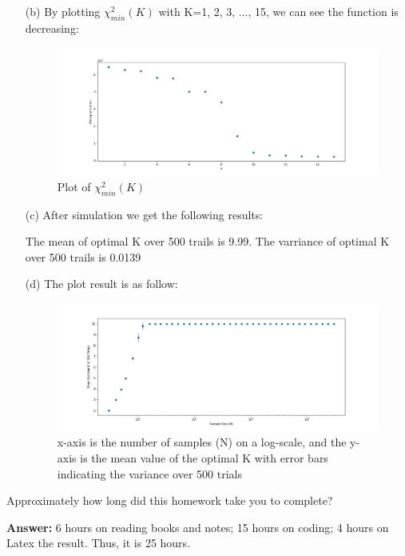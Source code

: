 \documentclass[submit]{harvardml}
\begin{document}
\begin{itemize}
\item[(b)]By plotting $\chi^2_{min}(K)$ with K=1, 2, 3, ..., 15, we can see the function is decreasing:
\begin{figure}[h]
\centering
\includegraphics[width=\textwidth]{data/3_b}
\caption{Plot of $\chi^2_{min}(K)$}
\label{fig:3_b}
\end{figure}

\item[(c)]After simulation we get the following results:

The mean of optimal K over 500 trails is 9.99.
The varriance of optimal K over 500 trails is 0.0139

\item[(d)] The plot result is as follow:
\begin{figure}[h]
\centering
\includegraphics[width=\textwidth]{data/3_d}
\caption{x-axis is the number of samples (N) on a log-scale, and the y-axis is the mean value of the optimal K with error bars indicating the variance over 500 trials}
\label{fig:3_d}
\end{figure}
\end{itemize}


\newpage
\begin{problem}[Calibration, 1pt]
Approximately how long did this homework take you to complete?
\end{problem}
\textbf{Answer:}
6 hours on reading books and notes; 15 hours on coding; 4 hours on Latex the result. Thus, it is 25 hours.
\end{document}
